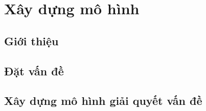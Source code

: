 %
\chapter{Xây dựng mô hình}
\label{sec:model}

\section{Giới thiệu}
\label{sec:model:intro}


\section{Đặt vấn đề}
\label{sec:model:problem}


\section{Xây dựng mô hình giải quyết vấn đề}
\label{sec:model:buildmodel}








